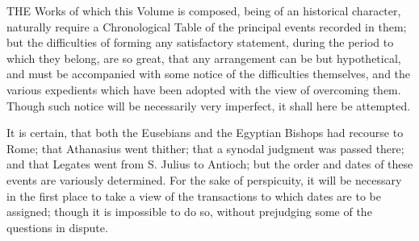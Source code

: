 
THE
Works of which this Volume is composed, being of an historical
character, naturally require a Chronological Table of the principal
events recorded in them; but the difficulties of forming any
satisfactory statement, during the period to which they belong, are so
great, that any arrangement can be but hypothetical, and must be
accompanied with some notice of the difficulties themselves, and the
various expedients which have been adopted with the view of overcoming
them. Though such notice will be necessarily very imperfect, it shall
here be attempted.


It is certain, that both the
Eusebians and the Egyptian Bishops had recourse to Rome; that
Athanasius went thither; that a synodal judgment was passed there; and
that Legates went from S. Julius to Antioch; but the order and dates
of these events are variously determined. For the sake of perspicuity,
it will be necessary in the first place to take a view of the
transactions to which dates are to be assigned; though it is
impossible to do so, without prejudging some of the questions in
dispute.

